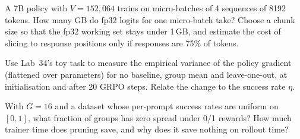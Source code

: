 \begin{exercise}
A 7B policy with $V=152{,}064$ trains on micro-batches of 4 sequences of 8192 tokens. How many
GB do fp32 logits for one micro-batch take? Choose a chunk size so that the fp32 working set
stays under 1\,GB, and estimate the cost of slicing to response positions only if responses are
75\% of tokens.
\end{exercise}

\begin{exercise}
Use Lab~34's toy task to measure the empirical variance of the policy gradient (flattened over
parameters) for no baseline, group mean and leave-one-out, at initialisation and after 20
GRPO steps. Relate the change to the success rate $\eta$.
\end{exercise}

\begin{exercise}
With $G=16$ and a dataset whose per-prompt success rates are uniform on $[0,1]$, what fraction
of groups has zero spread under 0/1 rewards? How much trainer time does pruning save, and why does
it save nothing on rollout time?
\end{exercise}

